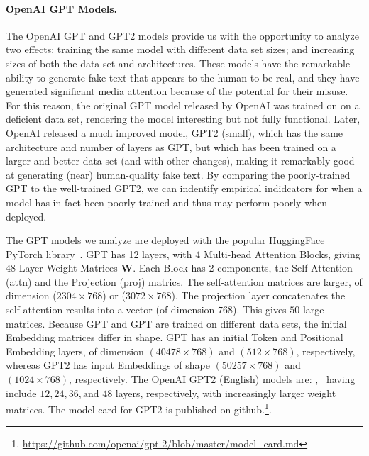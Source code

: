 



\paragraph{OpenAI GPT Models.}

The OpenAI GPT and GPT2 models provide us with the opportunity to analyze two effects: training the same model with different data set sizes; and increasing sizes of both the data set and architectures.
These models have the remarkable ability to generate fake text that appears to the human to be real, and they have generated significant media attention because of the potential for their misuse.
For this reason, the original GPT model released by OpenAI was trained on on a deficient data set, rendering the model interesting but not fully functional.  
Later, OpenAI released a much improved model, GPT2 (small), which has the same architecture and number of layers as GPT, but which has been trained on a larger and better data set (and with other changes), making it remarkably good at generating (near) human-quality fake text.  
%
By comparing the poorly-trained GPT to the well-trained GPT2, we can indentify empirical indidcators for when a model has in fact been poorly-trained and thus may perform poorly when deployed.

The GPT models we analyze are deployed with the popular HuggingFace PyTorch library~\cite{XXX-XXX}.
GPT has 12 layers, with 4 Multi-head Attention Blocks, giving $48$ Layer Weight Matrices $\mathbf{W}$.
Each Block has 2 components, the Self Attention (attn) and the Projection (proj) matrics.  
The self-attention  matrices are larger, of dimension ($2304\times 768$) or ($3072\times 768$).
The projection layer concatenates the self-attention results into a vector (of dimension $768$).
This gives $50$ large matrices.
%
Because GPT and GPT are trained on different data sets, the initial Embedding matrices differ in shape.
GPT  has an initial Token and Positional Embedding layers, of dimension $(40478\times 768)$ and $(512\times 768)$, respectively, whereas GPT2 has input Embeddings of shape $(50257\times 768)$ and $(1024\times 768)$, respectively. 
%
The OpenAI GPT2 (English) models are: , \
having include $12, 24, 36, \text{and }48$ layers, respectively, with increasingly larger weight matrices.
The model card for GPT2 is published on github.\footnote{\url{https://github.com/openai/gpt-2/blob/master/model_card.md}}.

